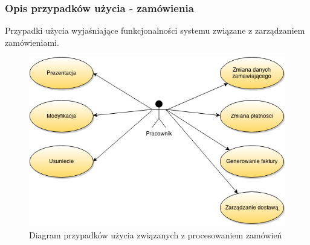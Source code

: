 \subsubsection{Opis przypadków użycia - zamówienia}

Przypadki użycia wyjaśniające funkcjonalności systemu związane z zarządzaniem
zamówieniami.

\begin{figure}[h!]
    \includegraphics[width=\textwidth,
    height=0.5\textheight]{graphics/UseCase/Zamowienia/UseCaseDiagram.png}
  \caption{Diagram przypadków użycia związanych z procesowaniem zamówień}
\end{figure}

\begin{enumerate}

	
	
	
	
  
\end{enumerate}
